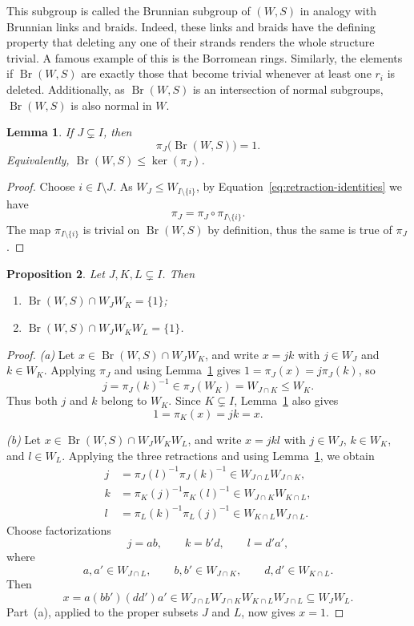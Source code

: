 \documentclass[11pt,letterpaper]{amsart}
\newtheorem{prop}{Proposition}[section]
\newtheorem{lemma}[prop]{Lemma}
\newcommand{\Br}{\operatorname{Br}}
\begin{document}
This subgroup is called the Brunnian subgroup of $(W,S)$ in analogy with Brunnian links and braids. Indeed, these links and braids have the defining property that deleting any one of their strands renders the  whole structure trivial. A famous example of this is the Borromean rings. 
Similarly, the elements if $\Br(W,S)$ are exactly those that become trivial whenever at least one $r_i$ is deleted.
Additionally, as $\Br(W,S)$ is an intersection of normal subgroups, $\Br(W,S)$ is also normal in $W$.

\begin{lemma}
\label{lem:pi(Br)trivial}
If $J\subsetneq I$, then
\[
    \pi_J\bigl(\Br(W,S)\bigr)=1.
\]
Equivalently, $\Br(W,S)\leq\ker(\pi_J)$.
\end{lemma}

\begin{proof}
Choose $i\in I\setminus J$. As $W_J\leq W_{I\setminus\{i\}}$, by
Equation~\eqref{eq:retraction-identities} we have
\[
    \pi_J=\pi_J\circ\pi_{I\setminus\{i\}}.
\]
The map $\pi_{I\setminus\{i\}}$ is trivial on $\Br(W,S)$ by definition, thus the
same is true of $\pi_J$.
\end{proof}

\begin{prop}
\label{prop:Brun_intersect}
Let $J,K,L\subsetneq I$.  Then
\begin{enumerate}
    \item $\Br(W,S)\cap W_JW_K=\{1\}$;
    \item $\Br(W,S)\cap W_JW_KW_L=\{1\}$.
\end{enumerate}
\end{prop}

\begin{proof}
\emph{(a)} Let $x\in\Br(W,S)\cap W_JW_K$, and write
$x=jk$ with $j\in W_J$ and $k\in W_K$.  Applying $\pi_J$ and using
Lemma~\ref{lem:pi(Br)trivial} gives
    $1=\pi_J(x)=j\pi_J(k)$,
so
\[
    j=\pi_J(k)^{-1}\in\pi_J(W_K)=W_{J\cap K}\leq W_K.
\]
Thus both $j$ and $k$ belong to $W_K$.  Since $K\subsetneq I$,
Lemma~\ref{lem:pi(Br)trivial} also gives
\[
    1=\pi_K(x)=jk=x.
\]

\emph{(b)} Let $x\in\Br(W,S)\cap W_JW_KW_L$, and write
$x=jkl$ with $j\in W_J$, $k\in W_K$, and $l\in W_L$.  Applying the three
retractions and using Lemma~\ref{lem:pi(Br)trivial}, we obtain
\begin{align*}
    j&=\pi_J(l)^{-1}\pi_J(k)^{-1}
       \in W_{J\cap L}W_{J\cap K},\\
    k&=\pi_K(j)^{-1}\pi_K(l)^{-1}
       \in W_{J\cap K}W_{K\cap L},\\
    l&=\pi_L(k)^{-1}\pi_L(j)^{-1}
       \in W_{K\cap L}W_{J\cap L}.
\end{align*}
Choose factorizations
\[
    j=ab,\qquad k=b'd,\qquad l=d'a',
\]
where
\[
    a,a'\in W_{J\cap L},\qquad
    b,b'\in W_{J\cap K},\qquad
    d,d'\in W_{K\cap L}.
\]
Then
\[
    x=a(bb')(dd')a'\in W_{J\cap L} W_{J\cap K} W_{K\cap L} W_{J\cap L}\subseteq W_JW_L.
\]
Part~(a), applied to the proper subsets $J$ and $L$, now gives $x=1$.
\end{proof}
\end{document}
